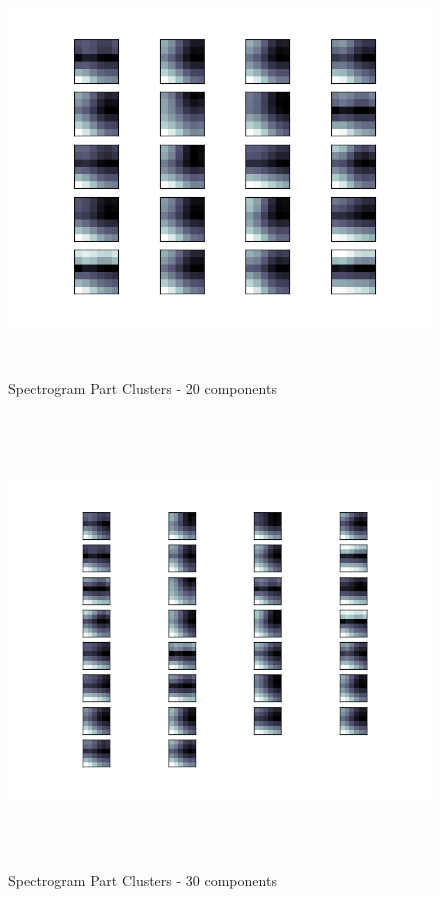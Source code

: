 \documentclass[11pt]{article}
\begin{document}
\begin{figure}[htb]
\centering
\includegraphics[height=11cm]{./spec_avg_parts_20.png}
\caption{\label{fig:spec_avg_parts_20}Spectrogram Part Clusters - 20 components}
\end{figure}

\begin{figure}[htb]
\centering
\includegraphics[height=12cm]{./spec_avg_parts_30.png}
\caption{\label{fig:spec_avg_parts_30}Spectrogram Part Clusters - 30 components}
\end{figure}
\end{document}
